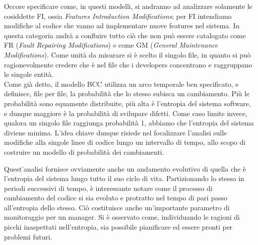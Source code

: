 Occore specificare come, in questi modelli, si andranno ad analizzare solamente le cosiddette FI, ossia \textit{Features Introduction Modifications}; per FI intendiamo modifiche al codice che vanno ad implementare nuove features nel sistema. In questa categoria andrà a confluire tutto ciò che non può essere catalogato come FR (\textit{Fault Repairing Modifications}) e come GM (\textit{General Maintenance Modifications}). Come unità da misurare si è scelto il singolo file, in quanto si può ragionevolmente credere che è nel file che i developers concentrano e raggruppano le singole entità.\\

Come già detto, il modello BCC utilizza un arco temporale ben specificato, e definisce, file per file, la probabilità che lo stesso subisca un cambiamento. Più le probabilità sono equamente distribuite, più alta è l'entropia del sistema software, e dunque maggiore è la probabilità di svilupare difetti. Come caso limite invece, qualora un singolo file raggiunga probabilità 1, abbiamo che l'entropia del sistema diviene minima. L'idea chiave dunque risiede nel focalizzare l'analisi sulle modifiche alla singole linee di codice lungo un intervallo di tempo, allo scopo di costruire un modello di probabilità dei cambiamenti.

Quest'analisi fornisce ovviamente anche un andamento evolutivo di quella che è l'entropia del sistema lungo tutto il suo ciclo di vita. Partizionando lo stesso in periodi successivi di tempo, è interessante notare come il processo di cambiamento del codice si sia evoluto e protratto nel tempo di pari passo all'entropia dello stesso. Ciò costituisce anche un'importante parametro di monitoraggio per un manager. Si è osservato come, individuando le ragioni di picchi inaspettati nell'entropia, sia possibile pianificare ed essere pronti per problemi futuri.\\


